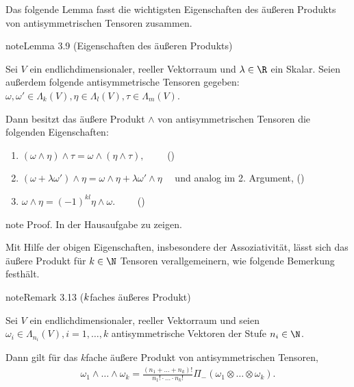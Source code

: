 \documentclass[letterpaper,10pt,english]{jupyterBook}
\begin{document}
\sphinxAtStartPar
Das folgende Lemma fasst die wichtigsten Eigenschaften des äußeren Produkts von antisymmetrischen Tensoren zusammen.
\label{vektoranalysis/tensor:lemma-35}
\begin{sphinxadmonition}{note}{Lemma 3.9 (Eigenschaften des äußeren Produkts)}



\sphinxAtStartPar
Sei \(V\) ein endlich\sphinxhyphen{}dimensionaler, reeller Vektorraum und \(\lambda \in \R\) ein Skalar.
Seien außerdem folgende antisymmetrische Tensoren gegeben: \(\omega, \omega' \in \Lambda_k(V), \eta \in \Lambda_l(V), \tau \in \Lambda_m(V)\).

\sphinxAtStartPar
Dann besitzt das äußere Produkt \(\wedge\) von antisymmetrischen Tensoren die folgenden Eigenschaften:
\begin{enumerate}
%
\item {} 
\sphinxAtStartPar
\((\omega \wedge \eta) \wedge \tau = \omega \wedge (\eta \wedge \tau), \qquad \) ()

\item {} 
\sphinxAtStartPar
\((\omega + \lambda \omega') \wedge \eta = \omega \wedge \eta + \lambda \omega' \wedge \eta\quad\) und analog im 2. Argument, ()

\item {} 
\sphinxAtStartPar
\(\omega \wedge \eta = (-1)^{kl} \eta \wedge \omega. \qquad\) ()

\end{enumerate}
\end{sphinxadmonition}

\begin{sphinxadmonition}{note}
\sphinxAtStartPar
Proof. In der Hausaufgabe zu zeigen.
\end{sphinxadmonition}

\sphinxAtStartPar
Mit Hilfe der obigen Eigenschaften, insbesondere der Assoziativität, lässt sich das äußere Produkt für \(k \in \N\) Tensoren verallgemeinern, wie folgende Bemerkung festhält.
\label{vektoranalysis/tensor:remark-36}
\begin{sphinxadmonition}{note}{Remark 3.13 (\protect\(k\protect\)\sphinxhyphen{}faches äußeres Produkt)}



\sphinxAtStartPar
Sei \(V\) ein endlich\sphinxhyphen{}dimensionaler, reeller Vektorraum und seien \(\omega_i \in \Lambda_{n_i}(V), i=1,\ldots,k\) antisymmetrische Vektoren der Stufe \(n_i \in \N\).

\sphinxAtStartPar
Dann gilt für das \(k\)\sphinxhyphen{}fache äußere Produkt von antisymmetrischen Tensoren,
\begin{equation}\label{equation:vektoranalysis/tensor:eq:kfachesProdukt}
\begin{split}\omega_1 \wedge \ldots \wedge \omega_k = \frac{(n_1 + \ldots + n_k)!}{n_1!\cdot \ldots \cdot n_k!} \Pi_-(\omega_1 \otimes \ldots \otimes \omega_k).\end{split}
\end{equation}\end{sphinxadmonition}
\end{document}
